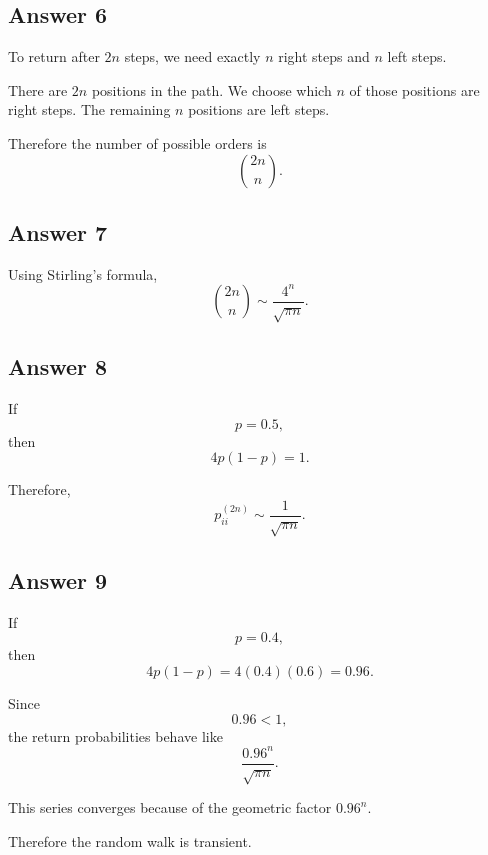 \documentclass[12pt,a4paper]{article}
\theoremstyle{notestyle}
\begin{document}
\subsection*{Answer 6}

To return after $2n$ steps, we need exactly $n$ right steps and $n$ left steps.

There are $2n$ positions in the path. We choose which $n$ of those positions are right steps. The remaining $n$ positions are left steps.

Therefore the number of possible orders is
\[
\binom{2n}{n}.
\]

\subsection*{Answer 7}

Using Stirling's formula,
\[
\binom{2n}{n}
\sim
\frac{4^n}{\sqrt{\pi n}}.
\]

\subsection*{Answer 8}

If
\[
p=0.5,
\]
then
\[
4p(1-p)=1.
\]

Therefore,
\[
p_{ii}^{(2n)}
\sim
\frac1{\sqrt{\pi n}}.
\]

\subsection*{Answer 9}

If
\[
p=0.4,
\]
then
\[
4p(1-p)=4(0.4)(0.6)=0.96.
\]

Since
\[
0.96<1,
\]
the return probabilities behave like
\[
\frac{0.96^n}{\sqrt{\pi n}}.
\]

This series converges because of the geometric factor $0.96^n$.

Therefore the random walk is transient.
\end{document}
